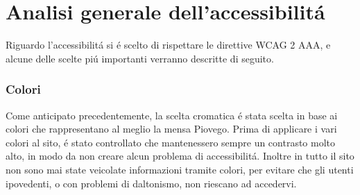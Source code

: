 \documentclass[10pt,a4paper,onecolumn]{article}
\begin{document}
\section{Analisi generale dell'accessibilit\'a}

Riguardo l'accessibilit\'a si \'e scelto di rispettare le direttive WCAG 2 AAA, e alcune delle scelte pi\'u importanti verranno descritte di seguito.

\subsubsection{Colori}

Come anticipato precedentemente, la scelta cromatica \'e stata scelta in base ai colori che rappresentano al meglio la mensa Piovego. Prima di applicare i vari colori al sito, \'e stato controllato che mantenessero sempre un contrasto molto alto, in modo da non creare alcun problema di accessibilit\'a. Inoltre in tutto il sito non sono mai state veicolate informazioni tramite colori, per evitare che gli utenti ipovedenti, o con problemi di daltonismo, non riescano ad accedervi.




\clearpage
\end{document}

